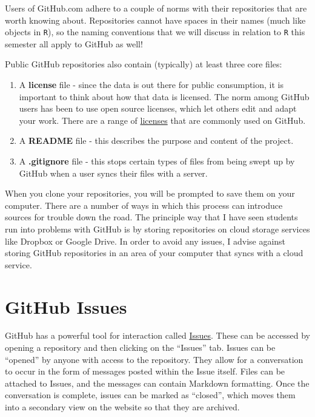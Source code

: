 \documentclass[]{book}
\theoremstyle{definition}
\theoremstyle{definition}
\theoremstyle{definition}
\theoremstyle{remark}
\begin{document}
Users of GitHub.com adhere to a couple of norms with their repositories
that are worth knowing about. Repositories cannot have spaces in their
names (much like objects in \texttt{R}), so the naming conventions that
we will discuss in relation to \texttt{R} this semester all apply to
GitHub as well!

Public GitHub repositories also contain (typically) at least three core
files:

\begin{enumerate}
\def\labelenumi{\arabic{enumi}.}
\item
  A \textbf{license} file - since the data is out there for public
  consumption, it is important to think about how that data is licensed.
  The norm among GitHub users has been to use open source licenses,
  which let others edit and adapt your work. There are a range of
  \href{http://choosealicense.com}{licenses} that are commonly used on
  GitHub.
\item
  A \textbf{README} file - this describes the purpose and content of the
  project.
\item
  A \textbf{.gitignore} file - this stops certain types of files from
  being swept up by GitHub when a user syncs their files with a server.
\end{enumerate}

When you clone your repositories, you will be prompted to save them on
your computer. There are a number of ways in which this process can
introduce sources for trouble down the road. The principle way that I
have seen students run into problems with GitHub is by storing
repositories on cloud storage services like Dropbox or Google Drive. In
order to avoid any issues, I advise against storing GitHub repositories
in an area of your computer that syncs with a cloud service.

\section{GitHub Issues}\label{github-issues}

GitHub has a powerful tool for interaction called
\href{https://help.github.com/articles/about-issues/}{Issues}. These can
be accessed by opening a repository and then clicking on the ``Issues''
tab. Issues can be ``opened'' by anyone with access to the repository.
They allow for a conversation to occur in the form of messages posted
within the Issue itself. Files can be attached to Issues, and the
messages can contain Markdown formatting. Once the conversation is
complete, issues can be marked as ``closed'', which moves them into a
secondary view on the website so that they are archived.
\end{document}
